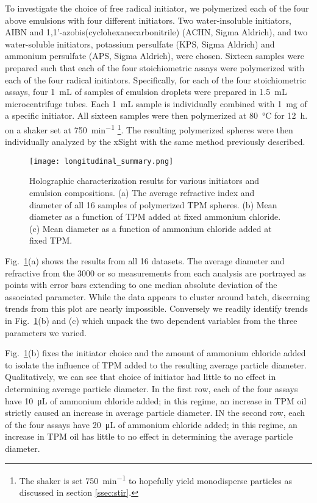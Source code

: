 
To investigate the choice of free radical initiator, we polymerized each of the four
above emulsions with four different initiators.
Two water-insoluble initiators, AIBN and
\num{1},\num{1}'-azobis(cyclohexanecarbonitrile) (ACHN, Sigma Aldrich),
and two water-soluble  initiators, potassium persulfate (KPS, Sigma Aldrich) and
ammonium persulfate (APS, Sigma Aldrich), were chosen.
Sixteen samples were prepared such that each of the four stoichiometric
assays were polymerized with each of the four radical initiators.
Specifically, for each of the four stoichiometric assays, four \SI{1}{\milli\liter} of
samples of emulsion droplets were prepared in \SI{1.5}{\milli\liter} microcentrifuge tubes.
Each \SI{1}{\milli\liter} sample is individually combined with \SI{1}{\milli\gram} of
a specific initiator.
All sixteen samples were then polymerized at \SI{80}{\celsius} for \SI{12}{\hour}.
on a shaker set at \SI{750}{\minute^{-1}} \footnote{The shaker is set \SI{750}{\minute^{-1}}
  to hopefully yield monodisperse particles as discussed in section \ref{ssec:stir}.}.
The resulting polymerized spheres were then individually analyzed by the xSight
with the same method previously described.

\begin{figure}
    \centering
    \texttt{[image: longitudinal\_summary.png]}
    \caption{Holographic characterization results for various initiators and
      emulsion compositions. (a) The average refractive index and diameter of
      all \num{16} samples of polymerized TPM spheres.
     (b) Mean diameter as a function of TPM added at fixed ammonium chloride.
     (c) Mean diameter as a function of ammonium chloride added at fixed TPM.}
    \label{fig:longitudinal_summary}
\end{figure}

Fig.~\ref{fig:longitudinal_summary}(a) shows the results from all \num{16} datasets.
The average diameter and refractive from the \num{3000} or so measurements from each analysis
are portrayed as points with error bars extending to one median absolute deviation
of the associated parameter. While the data appears to cluster around batch, discerning
trends from this plot are nearly impossible. Conversely we readily identify
trends in Fig.~\ref{fig:longitudinal_summary}(b) and (c) which unpack
the two dependent variables from the three parameters we varied.

Fig.~\ref{fig:longitudinal_summary}(b) fixes the initiator choice and the
amount of ammonium chloride added to isolate the influence of TPM added
to the resulting average particle diameter. Qualitatively, we can see that
choice of initiator had little to no effect in determining average particle
diameter. In the first row, each of the four assays have \SI{10}{\micro\liter}
of ammonium chloride added; in this regime, an increase in TPM oil strictly
caused an increase in average particle diameter. IN the second row, each of the four
assays have \SI{20}{\micro\liter} of ammonium chloride added; in this regime, an
increase in TPM oil has little to no effect in determining the average particle diameter.


